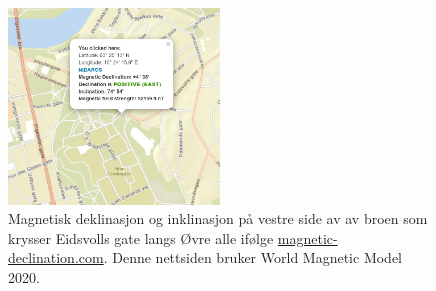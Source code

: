 \begin{figure}[h!]
    \centering
    \includegraphics[width=0.5\textwidth]{img/WMM.png}
    \caption{Magnetisk deklinasjon og inklinasjon på vestre side av av broen som krysser Eidsvolls gate langs Øvre alle ifølge \href{https://www.magnetic-declination.com/}{magnetic-declination.com}. Denne nettsiden bruker World Magnetic Model 2020. \cite{magnetic_declination}}
    \label{fig:WMM}
\end{figure}
